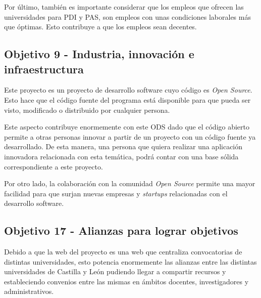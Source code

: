 Por último, también es importante considerar que los empleos que ofrecen las universidades para PDI y PAS, son empleos con unas condiciones laborales más que óptimas. Esto contribuye a que los empleos sean decentes.

\subsection{Objetivo 9 - Industria, innovación e infraestructura}
Este proyecto es un proyecto de desarrollo software cuyo código es \textit{Open Source}. Esto hace que el código fuente del programa está disponible para que pueda ser visto, modificado o distribuido por cualquier persona.

Este aspecto contribuye enormemente con este ODS dado que el código abierto permite a otras personas innovar a partir de un proyecto con un código fuente ya desarrollado. De esta manera, una persona que quiera realizar una aplicación innovadora relacionada con esta temática, podrá contar con una base sólida correspondiente a este proyecto.

Por otro lado, la colaboración con la comunidad \textit{Open Source} permite una mayor facilidad para que surjan nuevas empresas y \textit{startups} relacionadas con el desarrollo software.


\subsection{Objetivo 17 - Alianzas para lograr objetivos}
Debido a que la web del proyecto es una web que centraliza convocatorias de distintas universidades, esto potencia enormemente las alianzas entre las distintas universidades de Castilla y León pudiendo llegar a compartir recursos y estableciendo convenios entre las mismas en ámbitos docentes, investigadores y administrativos.

